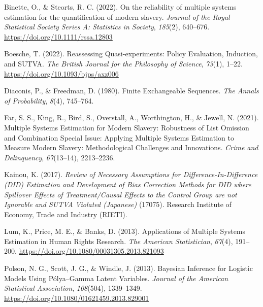 \documentclass[
  12pt,
]{article}
\newlength{\cslhangindent}
\newenvironment{CSLReferences}[2] %
 {\begin{list}{}{%
  \setlength{\itemindent}{0pt}
  \setlength{\leftmargin}{0pt}
  \setlength{\parsep}{0pt}
  \ifodd #1
   \setlength{\leftmargin}{\cslhangindent}
   \setlength{\itemindent}{-1\cslhangindent}
  \fi
  \setlength{\itemsep}{#2\baselineskip}}}
 {\end{list}}
\theoremstyle{plain}
\theoremstyle{definition}
\begin{document}
\label{refs}
\begin{CSLReferences}{1}{0}
Binette, O., \& Steorts, R. C. (2022). On the reliability of multiple
systems estimation for the quantification of modern slavery.
\emph{Journal of the Royal Statistical Society Series A: Statistics in
Society}, \emph{185}(2), 640--676.
\url{https://doi.org/10.1111/rssa.12803}

Boesche, T. (2022). Reassessing {Quasi-experiments}: {Policy
Evaluation}, {Induction}, and {SUTVA}. \emph{The British Journal for the
Philosophy of Science}, \emph{73}(1), 1--22.
\url{https://doi.org/10.1093/bjps/axz006}

Diaconis, P., \& Freedman, D. (1980). Finite {Exchangeable Sequences}.
\emph{The Annals of Probability}, \emph{8}(4), 745--764.

Far, S. S., King, R., Bird, S., Overstall, A., Worthington, H., \&
Jewell, N. (2021). Multiple {Systems Estimation} for {Modern Slavery}:
{Robustness} of {List Omission} and {Combination Special Issue}:
{Applying Multiple Systems Estimation} to {Measure Modern Slavery}:
{Methodological Challenges} and {Innovations}. \emph{Crime and
Delinquency}, \emph{67}(13--14), 2213--2236.

Kainou, K. (2017). \emph{Review of {Necessary Assumptions} for
{Difference-In-Difference} ({DID}) {Estimation} and {Development} of
{Bias Correction Methods} for {DID} where {Spillover Effects} of
{Treatment}/{Causal Effects} to the {Control Group} are not {Ignorable}
and {SUTVA Violated} ({Japanese})} (17075). {Research Institute of
Economy, Trade and Industry (RIETI).}

Lum, K., Price, M. E., \& Banks, D. (2013). Applications of {Multiple
Systems Estimation} in {Human Rights Research}. \emph{The American
Statistician}, \emph{67}(4), 191--200.
\url{https://doi.org/10.1080/00031305.2013.821093}

Polson, N. G., Scott, J. G., \& Windle, J. (2013). Bayesian {Inference}
for {Logistic Models Using Pólya}--{Gamma Latent Variables}.
\emph{Journal of the American Statistical Association}, \emph{108}(504),
1339--1349. \url{https://doi.org/10.1080/01621459.2013.829001}

\end{CSLReferences}
\end{document}

